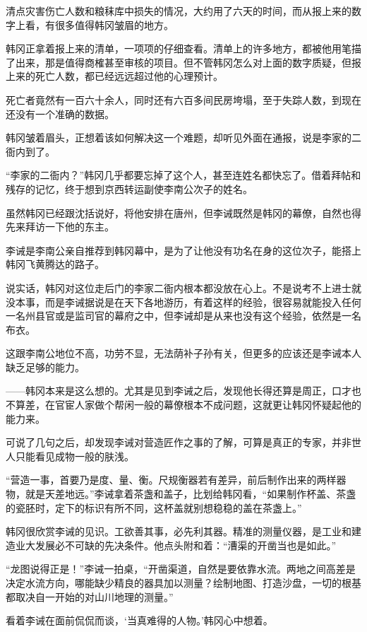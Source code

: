 清点灾害伤亡人数和粮秣库中损失的情况，大约用了六天的时间，而从报上来的数字上看，有很多值得韩冈皱眉的地方。

韩冈正拿着报上来的清单，一项项的仔细查看。清单上的许多地方，都被他用笔描了出来，那是值得商榷甚至审核的项目。但不管韩冈怎么对上面的数字质疑，但报上来的死亡人数，都已经远远超过他的心理预计。

死亡者竟然有一百六十余人，同时还有六百多间民房垮塌，至于失踪人数，到现在还没有一个准确的数据。

韩冈皱着眉头，正想着该如何解决这一个难题，却听见外面在通报，说是李家的二衙内到了。

“李家的二衙内？”韩冈几乎都要忘掉了这个人，甚至连姓名都快忘了。借着拜帖和残存的记忆，终于想到京西转运副使李南公次子的姓名。

虽然韩冈已经跟沈括说好，将他安排在唐州，但李诫既然是韩冈的幕僚，自然也得先来拜访一下他的东主。

李诫是李南公亲自推荐到韩冈幕中，是为了让他没有功名在身的这位次子，能搭上韩冈飞黄腾达的路子。

说实话，韩冈对这位走后门的李家二衙内根本都没放在心上。不是说考不上进士就没本事，而是李诫据说是在天下各地游历，有着这样的经验，很容易就能投入任何一名州县官或是监司官的幕府之中，但李诫却是从来也没有这个经验，依然是一名布衣。

这跟李南公地位不高，功劳不显，无法荫补子孙有关，但更多的应该还是李诫本人缺乏足够的能力。

——韩冈本来是这么想的。尤其是见到李诫之后，发现他长得还算是周正，口才也不算差，在官宦人家做个帮闲一般的幕僚根本不成问题，这就更让韩冈怀疑起他的能力来。

可说了几句之后，却发现李诫对营造匠作之事的了解，可算是真正的专家，并非世人只能看见成物一般的肤浅。

“营造一事，首要乃是度、量、衡。尺规衡器若有差异，前后制作出来的两样器物，就是天差地远。”李诫拿着茶盏和盖子，比划给韩冈看，“如果制作杯盖、茶盏的瓷胚时，定下的标识有所不同，这杯盖就别想稳稳的盖在茶盏上。”

韩冈很欣赏李诫的见识。工欲善其事，必先利其器。精准的测量仪器，是工业和建造业大发展必不可缺的先决条件。他点头附和着：“漕渠的开凿当也是如此。”

“龙图说得正是！”李诫一拍桌，“开凿渠道，自然是要依靠水流。两地之间高差是决定水流方向，哪能缺少精良的器具加以测量？绘制地图、打造沙盘，一切的根基都取决自一开始的对山川地理的测量。”

看着李诫在面前侃侃而谈，‘当真难得的人物。’韩冈心中想着。

